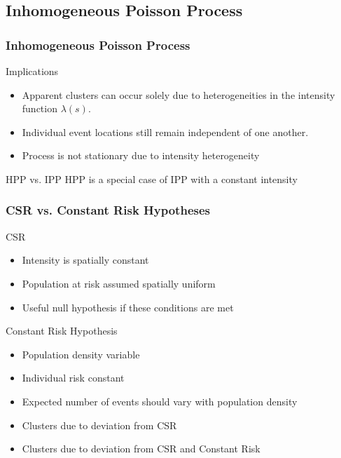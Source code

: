 \documentclass[nototal,handout]{beamer}
\begin{document}
 \subsection{Inhomogeneous Poisson Process}
\begin{frame}[<+->]
  \frametitle{Inhomogeneous Poisson Process}
  \begin{block}{Implications}
    \begin{itemize}
      \item Apparent clusters can occur solely due to heterogeneities in the intensity
	function $\lambda(s)$.
      \item Individual event locations still remain independent of one
	another.
      \item Process is not stationary due to intensity heterogeneity
    \end{itemize}
   \end{block}
   \begin{block}{HPP vs. IPP}
       HPP is a special case of IPP with a constant intensity
   \end{block}
 \end{frame}

\begin{frame}[<+->]
  \frametitle{CSR vs. Constant Risk Hypotheses}
  \begin{block}{CSR}
    \begin{itemize}
      \item Intensity is spatially constant 
      \item Population at risk assumed spatially uniform 
      \item Useful null hypothesis if these conditions are met
    \end{itemize}
   \end{block}
  \begin{block}{Constant Risk Hypothesis}

    \begin{itemize}
      \item Population density variable
      \item Individual risk constant
      \item Expected number of events should vary with population density
      \item Clusters due to deviation from CSR
      \item Clusters due to deviation from CSR and Constant Risk
    \end{itemize}

  \end{block}
 \end{frame}
\end{document}
